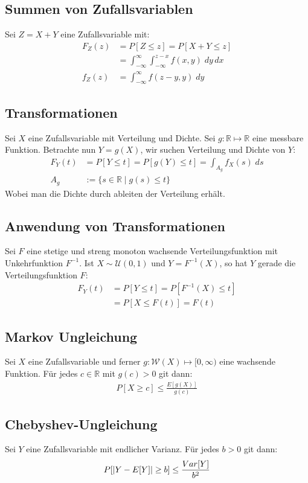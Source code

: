 \documentclass[8pt]{extarticle}
\newcommand{\R}{\mathbb{R}}
\newcommand{\W}{\mathcal{W}}
\begin{document}
\begin{multicols*}{3}
  \subsection*{Summen von Zufallsvariablen}
  Sei $Z = X + Y$ eine Zufallsvariable mit:
  \begin{align*}
    F_Z (z) & = P[Z \leq z] = P[X + Y \leq z]                                    \\
           & = \int_{-\infty}^\infty \int_{-\infty}^{z - x} f (x, y )\; dy \, dx \\
    f_Z (z) & = \int_{-\infty}^\infty f (z - y, y) \; dy
  \end{align*}
  \subsection*{Transformationen}
  Sei $X$ eine Zufallsvariable mit Verteilung und Dichte. Sei $g: \R \mapsto \R$
  eine messbare Funktion. Betrachte nun $Y = g (X)$, wir suchen Verteilung und
  Dichte von $Y$:
  \begin{align*}
    F_Y (t) & = P[Y \leq t] = P[g (Y) \leq t] = \int_{A_g} f_X (s) \; ds \\
    A_g    & := \{s \in \R \; | \; g (s) \leq t\}
  \end{align*}
  Wobei man die Dichte durch ableiten der Verteilung erhält.
  \subsection*{Anwendung von Transformationen}
  Sei $F$ eine stetige und streng monoton wachsende Verteilungsfunktion mit
  Unkehrfunktion $F^{-1}$. Ist $X \sim \mathcal{U} (0, 1)$ und $Y = F^{-1} (X)$, so
  hat $Y$ gerade die Verteilungsfunktion $F$:
  \begin{align*}
    F_Y (t) & = P[Y \leq t] = P[F^{-1} (X) \leq t] \\
           & = P[X \leq F (t)] = F (t)
  \end{align*}
  \subsection*{Markov Ungleichung}
  Sei $X$ eine Zufallsvariable und ferner $g : \W (X) \mapsto [0, \infty)$ eine
  wachsende Funktion. Für jedes $c \in \R$ mit $g (c) > 0$ git dann:
  \begin{align*}
    P[X \geq c] \leq \frac{E[g (X)]}{g (c)}
  \end{align*}
  \subsection*{Chebyshev-Ungleichung}
  Sei $Y$ eine Zufallsvariable mit endlicher Varianz. Für jedes $b > 0$ git dann:
  \begin{align*}
    P[\abs{Y - E[Y]} \geq b] \leq \frac{Var[Y]}{b^2}
  \end{align*}

\end{multicols*}
\end{document}
